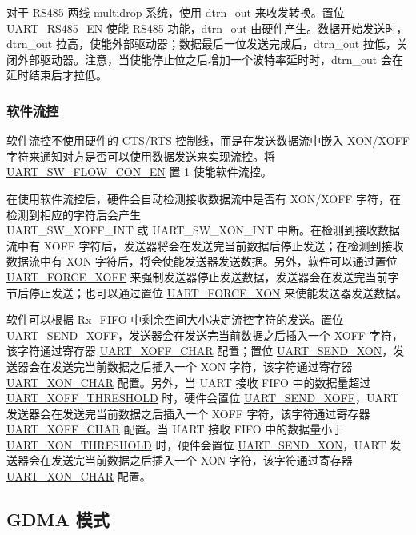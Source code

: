 \documentclass[main\_\_CN.tex]{subfiles}
\begin{document}
对于 RS485 两线 multidrop 系统，使用 dtrn\_out 来收发转换。置位 \hyperref[fielddesc:UARTRS485EN]{UART\_RS485\_EN} 使能 RS485 功能，dtrn\_out 由硬件产生。数据开始发送时，dtrn\_out 拉高，使能外部驱动器；数据最后一位发送完成后，dtrn\_out 拉低，关闭外部驱动器。注意，当使能停止位之后增加一个波特率延时时，dtrn\_out 会在延时结束后才拉低。



\subsubsection{软件流控}

软件流控不使用硬件的 CTS/RTS 控制线，而是在发送数据流中嵌入 XON/XOFF 字符来通知对方是否可以使用数据发送来实现流控。将 \hyperref[fielddesc:UARTSWFLOWCONEN]{UART\_SW\_FLOW\_CON\_EN} 置 1 使能软件流控。

在使用软件流控后，硬件会自动检测接收数据流中是否有 XON/XOFF 字符，在检测到相应的字符后会产生\\ UART\_SW\_XOFF\_INT 或 UART\_SW\_XON\_INT 中断。在检测到接收数据流中有 XOFF 字符后，发送器将会在发送完当前数据后停止发送；在检测到接收数据流中有 XON 字符后，将会使能发送器发送数据。另外，软件可以通过置位 \hyperref[fielddesc:UARTFORCEXOFF]{UART\_FORCE\_XOFF} 来强制发送器停止发送数据，发送器会在发送完当前字节后停止发送；也可以通过置位 \hyperref[fielddesc:UARTFORCEXON]{UART\_FORCE\_XON} 来使能发送器发送数据。

软件可以根据 Rx\_FIFO 中剩余空间大小决定流控字符的发送。置位 \hyperref[fielddesc:UARTSENDXOFF]{UART\_SEND\_XOFF}，发送器会在发送完当前数据之后插入一个 XOFF 字符，该字符通过寄存器 \hyperref[fielddesc:UARTXOFFCHAR]{UART\_XOFF\_CHAR} 配置；置位 \hyperref[fielddesc:UARTSENDXON]{UART\_SEND\_XON}，发送器会在发送完当前数据之后插入一个 XON 字符，该字符通过寄存器 \hyperref[fielddesc:UARTXONCHAR]{UART\_XON\_CHAR} 配置。另外，当 UART 接收 FIFO 中的数据量超过 \hyperref[fielddesc:UARTXOFFTHRESHOLD]{UART\_XOFF\_THRESHOLD} 时，硬件会置位 \hyperref[fielddesc:UARTSENDXOFF]{UART\_SEND\_XOFF}，UART 发送器会在发送完当前数据之后插入一个 XOFF 字符，该字符通过寄存器 \hyperref[fielddesc:UARTXOFFCHAR]{UART\_XOFF\_CHAR} 配置。当 UART 接收 FIFO 中的数据量小于 \hyperref[fielddesc:UARTXONTHRESHOLD]{UART\_XON\_THRESHOLD} 时，硬件会置位 \hyperref[fielddesc:UARTSENDXON]{UART\_SEND\_XON}，UART 发送器会在发送完当前数据之后插入一个 XON 字符，该字符通过寄存器 \hyperref[fielddesc:UARTXONCHAR]{UART\_XON\_CHAR} 配置。


\subsection{GDMA 模式}\label{sec:uart-gdma-control}
\end{document}
